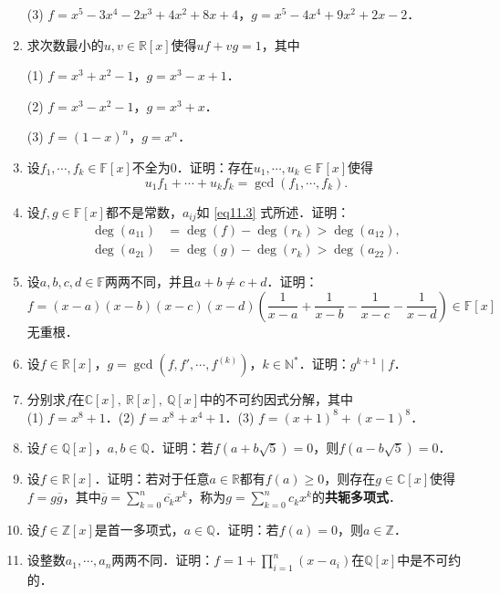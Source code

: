 \documentclass[a4paper,fontset=windows]{ctexbook}
\theoremstyle{definition}
\renewcommand{\ge}{\geqslant}
\begin{document}
\begin{enumerate}
(3) $f=x^5-3x^4-2x^3+4x^2+8x+4$，$g=x^5-4x^4+9x^2+2x-2$．

\item 求次数最小的$u,v\in\mathbb{R}[x]$使得$uf+vg=1$，其中

(1) $f=x^3+x^2-1$，$g=x^3-x+1$．

(2) $f=x^3-x^2-1$，$g=x^3+x$．

(3) $f=(1-x)^n$，$g=x^n$．

\item 设$f_1,\cdots,f_k\in\mathbb{F}[x]$不全为0．证明：存在$u_1,\cdots,u_k\in\mathbb{F}[x]$使得
$$u_1f_1+\cdots+u_kf_k=\gcd(f_1,\cdots,f_k).$$

\item 设$f,g\in\mathbb{F}[x]$都不是常数，$a_{ij}$如 \eqref{eq11.3} 式所述．证明：
\begin{align*}
\deg(a_{11})&=\deg(f)-\deg(r_k)>\deg(a_{12}), \\
\deg(a_{21})&=\deg(g)-\deg(r_k)>\deg(a_{22}).
\end{align*}

\item 设$a,b,c,d\in\mathbb{F}$两两不同，并且$a+b\ne c+d$．证明：
$$f=(x-a)(x-b)(x-c)(x-d)\left(\frac{1}{x-a}+\frac{1}{x-b}-\frac{1}{x-c}-\frac{1}{x-d}\right)\in\mathbb{F}[x]$$
无重根．

\item 设$f\in\mathbb{R}[x]$，$g=\gcd(f,f',\cdots,f^{(k)})$，$k\in\mathbb{N}^*$．证明：$g^{k+1}\mid f$．

\item 分别求$f$在$\mathbb{C}[x],~\mathbb{R}[x],~\mathbb{Q}[x]$中的不可约因式分解，其中 \\
(1) $f=x^8+1$．\qquad (2) $f=x^8+x^4+1$．\qquad (3) $f=(x+1)^8+(x-1)^8$．

\item 设$f\in\mathbb{Q}[x]$，$a,b\in\mathbb{Q}$．证明：若$f(a+b\sqrt{5})=0$，则$f(a-b\sqrt{5})=0$．

\item 设$f\in\mathbb{R}[x]$．证明：若对于任意$a\in\mathbb{R}$都有$f(a)\ge 0$，则存在$g\in\mathbb{C}[x]$使得$f=g\overline{g}$，其中$\overline{g}=\sum\limits_{k=0}^n\overline{c_k}x^k$，称为$g=\sum\limits_{k=0}^nc_kx^k$的{\bf 共轭多项式}．

\item 设$f\in\mathbb{Z}[x]$是首一多项式，$a\in\mathbb{Q}$．证明：若$f(a)=0$，则$a\in\mathbb{Z}$．

\item 设整数$a_1,\cdots,a_n$两两不同．证明：$f=1+\prod\limits_{i=1}^n(x-a_i)$在$\mathbb{Q}[x]$中是不可约的．


\end{enumerate}
\end{document}
